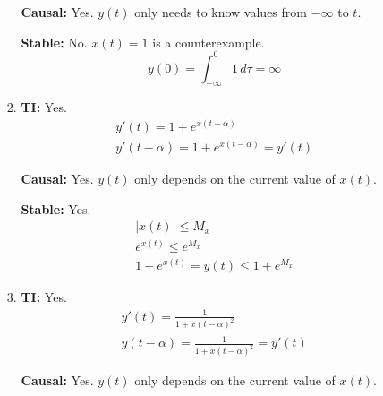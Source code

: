 \documentclass[12pt]{article}
\begin{document}
\begin{enumerate}
\begin{enumerate}
\begin{enumerate}
                                    \textbf{Causal:} Yes.
                                    $y(t)$ only needs to know values from $-\infty$ to $t$.

                                    \textbf{Stable:} No.
                                    $x(t)=1$ is a counterexample.
                                    \[y(0)=\int_{-\infty}^{0}1\,d\tau=\infty\]
                              \item \textbf{TI:} Yes.
                                    \begin{gather*}
                                          y'(t)=1+e^{x(t-\alpha)} \\
                                          y'(t-\alpha)=1+e^{x(t-\alpha)}= y'(t)
                                    \end{gather*}

                                    \textbf{Causal:} Yes.
                                    $y(t)$ only depends on the current value of $x(t)$.

                                    \textbf{Stable:} Yes.
                                    \begin{gather*}
                                          |x(t)| \le M_x \\
                                          e^{x(t)} \le e^{M_x} \\
                                          1+e^{x(t)}=y(t) \le 1+e^{M_x}
                                    \end{gather*}
                              \item \textbf{TI:} Yes.
                              \begin{gather*}
                                    y'(t) = \frac{1}{1+x(t-\alpha)^2} \\
                                    y(t-\alpha)=\frac{1}{1+x(t-\alpha)^2}=y'(t)
                              \end{gather*}

                                    \textbf{Causal:} Yes.
                                    $y(t)$ only depends on the current value of $x(t)$.


\end{enumerate}
\end{enumerate}
\end{enumerate}
\end{document}
